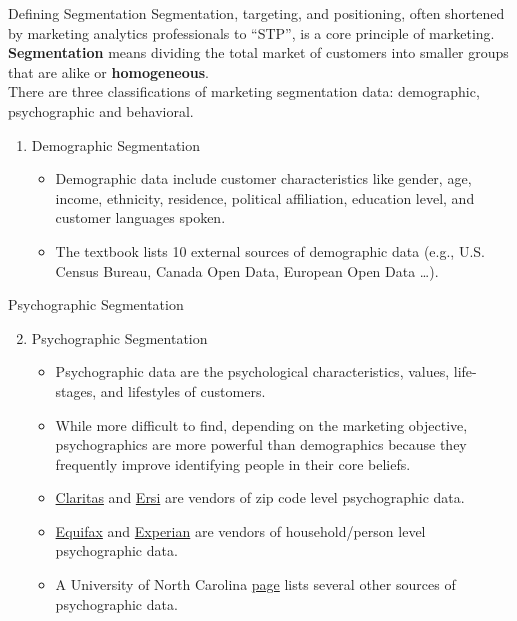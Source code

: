 \documentclass[pdf]{beamer}
\newcommand{\empr}[1]{{\color{franklinblue}\textbf{#1}}}
\theoremstyle{remark}
\theoremstyle{definition}
\begin{document}
\begin{frame}[t]{Defining Segmentation}
Segmentation, targeting, and positioning, often shortened by marketing analytics professionals to ``STP'', is a core principle of marketing. \empr{Segmentation} means dividing the total market of customers into smaller groups that are alike or \empr{homogeneous}. \\
\vspace{1.5ex}
There are three classifications of marketing segmentation data: demographic, psychographic and behavioral.\\
\vspace{1.5ex}
\begin{enumerate}
\item Demographic Segmentation
\small
\begin{itemize}
 \item Demographic data include customer characteristics like gender, age, income, ethnicity, residence, political affiliation, education level, and customer languages spoken.
 \item The textbook lists 10 external sources of demographic data (e.g., U.S. Census Bureau, Canada Open Data, European Open Data \ldots).
\end{itemize}
\end{enumerate}
\end{frame}

\begin{frame}[t]{Psychographic Segmentation}
\begin{enumerate}
 \setcounter{enumi}{1}
 \item Psychographic Segmentation
 \begin{itemize}
  \item Psychographic data are the psychological characteristics, values, life-stages, and lifestyles of customers.
  \item While more difficult to find, depending on the marketing objective, psychographics are more powerful than demographics because they frequently improve identifying people in their core beliefs. 
  \item \href{https://claritas.com/prizm-premier/}{Claritas} and \href{https://www.esri.com/en-us/home}{Ersi} are vendors of zip code level psychographic data.
  \item \href{https://www.equifax.com/business/product/economic-cohorts/}{Equifax} and \href{https://www.experian.com/marketing-services/mosaic}{Experian} are vendors of household/person level psychographic data.\
  \item  A University of North Carolina \href{https://guides.lib.unc.edu/market-research-tutorial/psychographics}{page} lists several other sources of psychographic data. 
\end{itemize}
\end{enumerate}
\end{frame}
\end{document}
